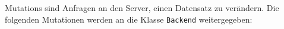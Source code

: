 Mutations sind Anfragen an den Server, einen Datensatz zu verändern.
Die folgenden Mutationen werden an die Klasse \verb#Backend# weitergegeben: